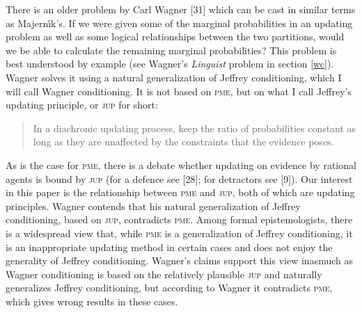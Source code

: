 \documentclass[entropy,article,submit,oneauthor,pdftex,12pt,a4paper]{mdpi}
\newenvironment{quotex}{\begin{quote}\begin{footnotesize}}{\end{footnotesize}\end{quote}}
\begin{document}
There is an older problem by Carl Wagner [31] which can be cast in
similar terms as Majern{\'\i}k's. If we were given some of the
marginal probabilities in an updating problem as well as some logical
relationships between the two partitions, would we be able to
calculate the remaining marginal probabilities? This problem is best
understood by example (see Wagner's \emph{Linguist} problem in section
\ref{wc}). Wagner solves it using a natural generalization of Jeffrey
conditioning, which I will call Wagner conditioning. It is not based
on \textsc{pme}, but on what I call Jeffrey's updating principle, or
\textsc{jup} for short:

\begin{quotex}
  [\textsc{jup}] In a diachronic updating process, keep the ratio of
  probabilities constant as long as they are unaffected by the
  constraints that the evidence poses.
\end{quotex}

As is the case for \textsc{pme}, there is a debate whether updating on
evidence by rational agents is bound by \textsc{jup} (for a defence
see [28]; for detractors see [9]). Our interest in this paper is the
relationship between \textsc{pme} and \textsc{jup}, both of which are
updating principles. Wagner contends that his natural generalization
of Jeffrey conditioning, based on \textsc{jup}, contradicts
\textsc{pme}. Among formal epistemologists, there is a widespread view
that, while \textsc{pme} is a generalization of Jeffrey conditioning,
it is an inappropriate updating method in certain cases and does not
enjoy the generality of Jeffrey conditioning. Wagner's claims support
this view inasmuch as Wagner conditioning is based on the relatively
plausible \textsc{jup} and naturally generalizes Jeffrey conditioning,
but according to Wagner it contradicts \textsc{pme}, which gives wrong
results in these cases.

\end{document}
